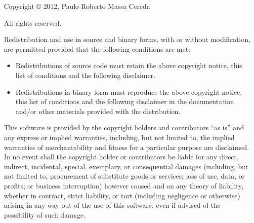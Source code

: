 \documentclass[a4paper,twoside,12pt]{memoir}
\begin{document}
\vspace{1em}

\begin{center}
\scalebox{0.5}{\araralogo}

\slogan
\end{center}

\vspace{0.5em}

\noindent Copyright \copyright{} 2012, Paulo Roberto Massa Cereda

\noindent All rights reserved.

\vspace{1em}

\noindent Redistribution and use in source and binary forms, with or without modification, are permitted provided that the following conditions are met:

\begin{itemize}
\item Redistributions of source code must retain the above copyright notice, this list of conditions and the following disclaimer.
\item Redistributions in binary form must reproduce the above copyright notice, this list of conditions and the following disclaimer in the documentation and/or other materials provided with the distribution.
\end{itemize}

\noindent This software is provided by the copyright holders and contributors ``as is'' and any express or implied warranties, including, but not limited to, the implied warranties of merchantability and fitness for a particular purpose are disclaimed. In no event shall the copyright holder or contributors be liable for any direct, indirect, incidental, special, exemplary, or consequential damages (including, but not limited to, procurement of substitute goods or services; loss of use, data, or profits; or business interruption) however caused and on any theory of liability, whether in contract, strict liability, or tort (including negligence or otherwise) arising in any way out of the use of this software, even if advised of the possibility of such damage.

%
%
%

\cleardoublepage
\end{document}
